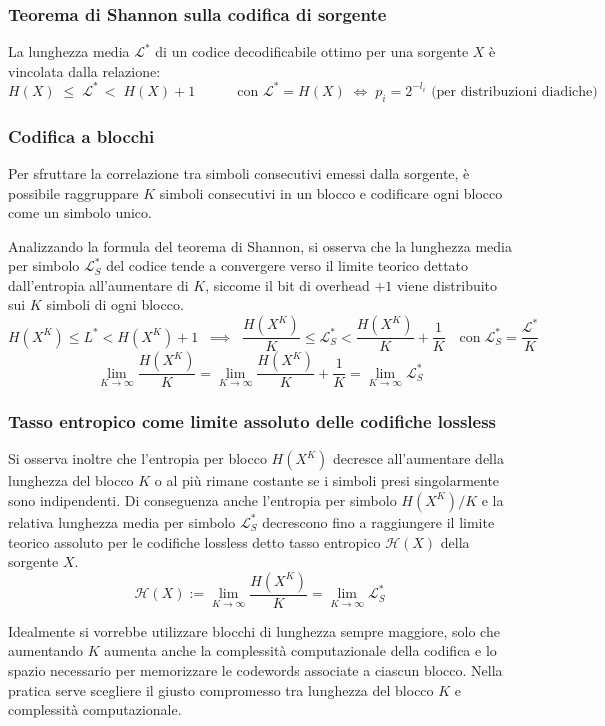 \subsubsection*{Teorema di Shannon sulla codifica di sorgente}
La lunghezza media \(\mathcal{L}^*\) di un codice decodificabile ottimo per una sorgente \(X\) è vincolata dalla relazione:
\[H(X) \; \leq \; \mathcal{L}^* \, < \; H(X) + 1 \qquad\quad \text{con } \mathcal{L}^* = H(X) \; \Longleftrightarrow \; p_i = 2^{-l_i} \text{ (per distribuzioni diadiche)}\]

\subsubsection*{Codifica a blocchi}
Per sfruttare la correlazione tra simboli consecutivi emessi dalla sorgente, è possibile raggruppare \(K\) simboli
consecutivi in un blocco e codificare ogni blocco come un simbolo unico.

Analizzando la formula del teorema di Shannon, si osserva che la lunghezza media per simbolo \(\mathcal{L}_S^*\) del codice
tende a convergere verso il limite teorico dettato dall'entropia all'aumentare di \(K\), siccome il bit di overhead \(+ 1\)
viene distribuito sui \(K\) simboli di ogni blocco.
\[H(X^K) \leq L^* < H(X^K) + 1 \;\; \implies \;\; \frac{H(X^K)}{K} \leq \mathcal{L}_S^* < \frac{H(X^K)}{K} + \frac{1}{K} \quad \text{con} \; \mathcal{L}_S^* = \frac{\mathcal{L}^*}{K}\]
\[\lim_{K \to \infty} \frac{H(X^K)}{K} = \lim_{K \to \infty} \frac{H(X^K)}{K} + \frac{1}{K} = \lim_{K \to \infty} \mathcal{L}_S^*\]

\subsubsection*{Tasso entropico come limite assoluto delle codifiche lossless}
Si osserva inoltre che l'entropia per blocco \(H(X^K)\) decresce all'aumentare della lunghezza del blocco \(K\) o al più
rimane costante se i simboli presi singolarmente sono indipendenti. Di conseguenza anche l'entropia per simbolo \(H(X^K)/K\)
e la relativa lunghezza media per simbolo \(\mathcal{L}_S^*\) decrescono fino a raggiungere il limite teorico assoluto per
le codifiche lossless detto tasso entropico \(\mathcal{H}(X)\) della sorgente \(X\).
\[\mathcal{H}(X) := \lim_{K \to \infty} \frac{H(X^K)}{K} = \lim_{K \to \infty} \mathcal{L}_S^*\]

Idealmente si vorrebbe utilizzare blocchi di lunghezza sempre maggiore, solo che aumentando \(K\) aumenta anche la complessità
computazionale della codifica e lo spazio necessario per memorizzare le codewords associate a ciascun blocco. Nella pratica
serve scegliere il giusto compromesso tra lunghezza del blocco \(K\) e complessità computazionale.

